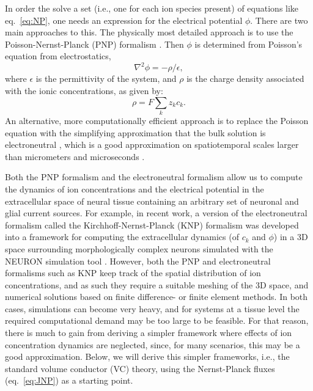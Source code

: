 \documentclass[preprint,11pt,authoryear]{elsarticle}
\begin{document}
In order the solve a set (i.e., one for each ion species present) of equations like eq.~\ref{eq:NP}, one needs an expression for the electrical potential $\phi$. There are two main approaches to this. The physically most detailed approach is to use the Poisson-Nernst-Planck (PNP) formalism \citep{Leonetti1998, Leonetti2004, Lu2007, Lopreore2008, Nanninga2008, Pods2013, Gardner2015}. Then $\phi$ is determined from Poisson's equation from electrostatics, 
\begin{equation}
\nabla^2 \phi = -\rho/\epsilon, 
\label{eq:poisson}
\end{equation}
where $\epsilon$ is the permittivity of the system, and $\rho$ is the charge density associated with the ionic concentrations, as given by:
\begin{equation}
\rho = F \sum_k z_k c_k.
\label{eq:F}
\end{equation}
An alternative, more computationally efficient approach is to replace the Poisson equation with the simplifying approximation that the bulk solution is electroneutral \citep{Mori2008, Mori2009, Mori2009a, Mori2011, Halnes2015, Halnes2013, Pods2017, Niederer2013, OConnell2016, Solbra2018}, which is a good approximation on spatiotemporal scales larger than micrometers and microseconds \citep{Grodzinsky2011, Pods2017, Solbra2018}. 

Both the PNP formalism and the electroneutral formalism allow us to compute the dynamics of ion concentrations and the electrical potential in the extracellular space of neural tissue containing an arbitrary set of neuronal and glial current sources. For example, in recent work, a version of the electroneutral formalism called the Kirchhoff-Nernst-Planck (KNP) formalism was developed into a framework for computing the extracellular dynamics (of $c_k$ and $\phi$) in a 3D space surrounding morphologically complex neurons simulated with the NEURON simulation tool \citep{Solbra2018}. However, both the PNP and electroneutral formalisms such as KNP keep track of the spatial distribution of ion concentrations, and as such they require a suitable meshing of the 3D space, and numerical solutions based on finite difference- or finite element methods. In both cases, simulations can become very heavy, and for systems at a tissue level the required computational demand may be too large to be feasible. For that reason, there is much to gain from deriving a simpler framework where effects of ion concentration dynamics are neglected, since, for many scenarios, this may be a good approximation. Below, we will derive this simpler frameworks, i.e., the standard volume conductor (VC) theory, using the Nernst-Planck fluxes (eq.~\ref{eq:JNP}) as a starting point.
\end{document}
